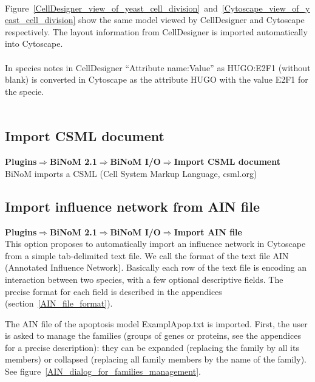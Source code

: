 \\Figure~\ref{CellDesigner_view_of_yeast_cell_division}~and~\ref{Cytoscape_view_of_yeast_cell_division} show the same model viewed by CellDesigner and Cytoscape respectively. The layout information from CellDesigner is imported automatically into Cytoscape.\\\\
In species notes in CellDesigner “Attribute name:Value” as HUGO:E2F1 (without blank) is converted in Cytoscape as the attribute HUGO with the value E2F1 for the specie.\\\\



\subsection{Import CSML document}
\textbf{Plugins$\Rightarrow$BiNoM 2.1$\Rightarrow$BiNoM I/O$\Rightarrow$Import CSML document}\\
BiNoM imports a CSML (Cell System Markup Language, csml.org)



\subsection{Import influence network from AIN file} \label{Import_AIN_file}

\textbf{Plugins$\Rightarrow$BiNoM 2.1$\Rightarrow$BiNoM I/O$\Rightarrow$Import AIN file}\\

This option proposes to automatically import an influence network in Cytoscape
from a simple tab-delimited text file. We call the format of the
text file AIN (Annotated Influence Network). Basically each row of the text file is encoding an
interaction between two species, with a few optional descriptive fields. The precise
format for each field is described in the appendices (section~\ref{AIN_file_format}). 

The AIN file of the apoptosis model ExamplApop.txt is imported. First, the user
is asked to manage the families (groups of genes or proteins, see the appendices
for a precise description): they can be expanded (replacing the family by all
its members) or collapsed (replacing all family members by the name of the
family). See figure~\ref{AIN_dialog_for_families_management}.\\\\

